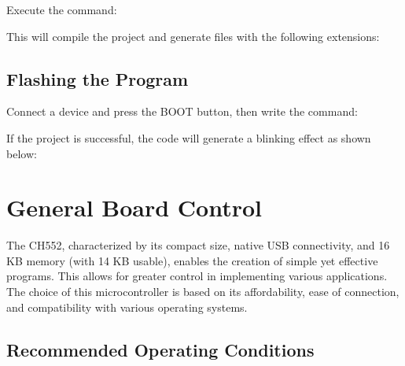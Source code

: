 \documentclass[letterpaper,10pt,english]{sphinxmanual}
\begin{document}
\sphinxAtStartPar
Execute the command:

\begin{sphinxVerbatim}[commandchars=\\\{\}]
 
\end{sphinxVerbatim}

\sphinxAtStartPar
This will compile the project and generate files with the following extensions:



\section{Flashing the Program}
\label{\detokenize{compile:flashing-the-program}}
\sphinxAtStartPar
Connect a device and press the BOOT button, then write the command:

\begin{sphinxVerbatim}[commandchars=\\\{\}]
 
\end{sphinxVerbatim}

\sphinxAtStartPar
If the project is successful, the code will generate a blinking effect as shown below:

\begin{figure}[htbp]
\centering

\noindent{}
\end{figure}

\sphinxstepscope


\chapter{General Board Control}
\label{\detokenize{generalboardcontrol:general-board-control}}\label{\detokenize{generalboardcontrol::doc}}
\sphinxAtStartPar
The CH552, characterized by its compact size, native USB connectivity, and 16 KB memory (with 14 KB usable), enables the creation of simple yet effective programs. This allows for greater control in implementing various applications. The choice of this microcontroller is based on its affordability, ease of connection, and compatibility with various operating systems.


\section{Recommended Operating Conditions}
\label{\detokenize{generalboardcontrol:recommended-operating-conditions}}
\end{document}

